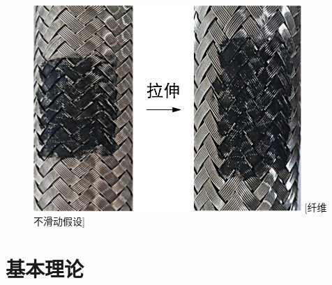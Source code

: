\begin{figure}[!htp]
{	}
\label{fig:braid-angle-chap3-1}
\end{figure}

\begin{figure}[!htp]
	\centering
	\includegraphics[width=0.5\linewidth]{figure/chap3/hypothesis}
	[纤维不滑动假设]
	\label{fig:hypothesis}
\end{figure}

\section{基本理论}

